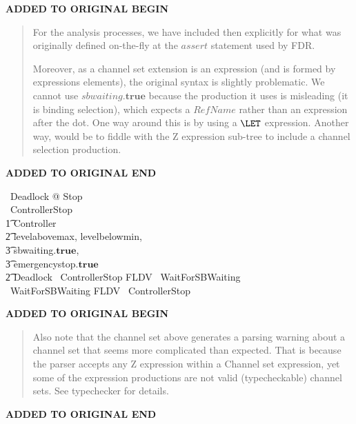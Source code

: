 \documentclass{report}
\newcommand{\true}{\ensuremath{\mathbf{true}}}
\newcommand{\false}{\ensuremath{\mathbf{false}}}
\newenvironment{addedstuff}{\begin{flushleft}\textbf{ADDED TO ORIGINAL BEGIN}\begin{quote}\begin{minipage}{.8\textwidth}}{\end{minipage}\end{quote}\textbf{ADDED TO ORIGINAL END}\end{flushleft}}
\begin{document}
\begin{addedstuff}
   For the analysis processes, we have included then explicitly for
   what was originally defined on-the-fly at the $assert$ statement
   used by FDR.

   Moreover, as a channel set extension is an expression (and is formed by expressions elements),
   the original syntax is slightly problematic. We cannot use $sbwaiting.\true$ because the production
   it uses is misleading (it is binding selection), which expects a $RefName$ rather than an expression
   after the dot. One way around this is by using a $\LET$ expression. Another way, would be to
   fiddle with the Z expression sub-tree to include a channel selection production.
\end{addedstuff}
%
\begin{circus}
   \circprocess\ Deadlock \circdef \circbegin @ Stop \circend \\
   \circprocess\ ControllerStop \circdef \\
        \t1 Controller \\
            \t2 \lpar \lchanset levelabovemax, levelbelowmin, \\
                            \t3  sbwaiting.\true, \\
                            \t3  emergencystop.\true \rchanset \rpar \\
        \t2 Deadlock
   \also
   \circassertref\ ControllerStop \circrefines FLDV~ WaitForSBWaiting \\
   \circassertref\ WaitForSBWaiting \circrefines FLDV~ ControllerStop
\end{circus}
%
\begin{addedstuff}
   Also note that the channel set above generates a parsing warning about a channel set
   that seems more complicated than expected. That is because the parser accepts any Z
   expression within a Channel set expression, yet some of the expression productions
   are not valid (typecheckable) channel sets. See typechecker for details.
\end{addedstuff}
\end{document}
